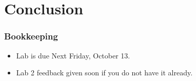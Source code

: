\documentclass[aspectratio=169]{beamer}
\begin{document}
\section{Conclusion}
\begin{frame}
  \frametitle{Bookkeeping}
  \begin{itemize}
  \item Lab is due Next Friday, October 13.
  \item Lab 2 feedback given soon if you do not have it already.
  \end{itemize}
\end{frame}
\end{document}
